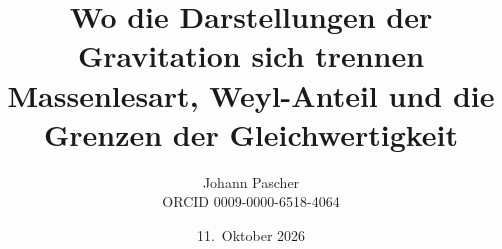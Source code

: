 \documentclass[11pt,a4paper]{report}
\title{Wo die Darstellungen der Gravitation sich trennen\\[0.5em]
  \large Massenlesart, Weyl-Anteil und die Grenzen der Gleichwertigkeit}
\date{11.~Oktober 2026}
\author{Johann Pascher\\\small ORCID 0009-0000-6518-4064}
\begin{document}
\renewcommand{\thechapter}{}
\renewcommand{\thesection}{\arabic{section}}
\maketitle
\tableofcontents

\end{document}

